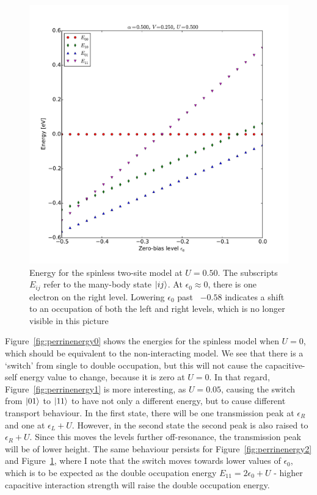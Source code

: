 \begin{figure}[!bt]
    \centering
    \includegraphics[height=.45\textheight]{pdf/energy/perrin_distribution_u3.pdf}
    \caption{Energy for the spinless two-site model at $U=0.50$. The subscripts $E_{ij}$ refer to the many-body state $\ket{i j}$. At $\epsilon_0 \approx 0$, there is one electron on the right level. Lowering $\epsilon_0$ past ~$-0.58$ indicates a shift to an occupation of both the left and right levels, which is no longer visible in this picture  }
    \label{fig:perrinenergy3}
\end{figure}

Figure~\ref{fig:perrinenergy0} shows the energies for the spinless model when $U=0$, which should be equivalent to the non-interacting model. We see that there is a `switch' from single to double occupation, but this will not cause the capacitive-self energy value to change, because it is zero at $U=0$. In that regard, Figure~\ref{fig:perrinenergy1} is more interesting, as $U=0.05$, causing the switch from $\ket{01}$ to $\ket{11}$ to have not only a different energy, but to cause different transport behaviour. In the first state, there will be one transmission peak at $\epsilon_R$ and one at $\epsilon_L + U$. However, in the second state the second peak is also raised to $\epsilon_R+U$. Since this moves the levels further off-resonance, the transmission peak will be of lower height. The same behaviour persists for Figure~\ref{fig:perrinenergy2} and Figure~\ref{fig:perrinenergy3}, where I note that the switch moves towards lower values of $\epsilon_0$, which is to be expected as the double occupation energy $E_{11} = 2\epsilon_0 + U$ - higher capacitive interaction strength will raise the double occupation energy.
 
